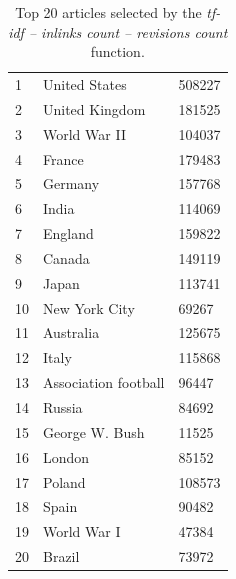 \begin{table}
    \centering
    \caption {Top 20 articles selected by the \emph{tf-idf -- inlinks count --
revisions count} function.}
  \label{tab:inl-rc}
    \begin{tabular}{lll}
    1  & United States        & 508227 \\
    2  & United Kingdom       & 181525 \\
    3  & World War II         & 104037 \\
    4  & France               & 179483 \\
    5  & Germany              & 157768 \\
    6  & India                & 114069 \\
    7  & England              & 159822 \\
    8  & Canada               & 149119 \\
    9  & Japan                & 113741 \\
    10 & New York City        & 69267  \\
    11 & Australia            & 125675 \\
    12 & Italy                & 115868 \\
    13 & Association football & 96447  \\
    14 & Russia               & 84692  \\
    15 & George W. Bush       & 11525  \\
    16 & London               & 85152  \\
    17 & Poland               & 108573 \\
    18 & Spain                & 90482  \\
    19 & World War I          & 47384  \\
    20 & Brazil               & 73972  \\
    \end{tabular}
\end{table}

